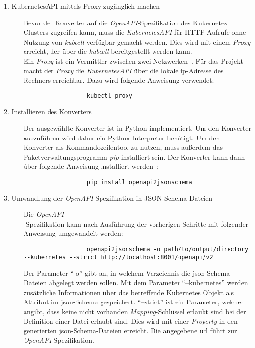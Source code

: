 \begin{description}
  \item[1. KubernetesAPI mittels Proxy zugänglich machen]
        Bevor der Konverter auf die \textit{OpenAPI}-Spezifikation des Kubernetes Clusters zugreifen kann, muss die \textit{KubernetesAPI}
        für HTTP-Aufrufe ohne Nutzung von \textit{kubectl} verfügbar gemacht werden. Dies wird mit einem \textit{Proxy} erreicht, der über die \textit{kubectl}
        bereitgestellt werden kann. \\
        Ein \textit{Proxy} ist ein Vermittler zwischen zwei Netzwerken~\cite{proxy-ryte-wiki,proxy-it-service-network}.
        Für das Projekt macht der \textit{Proxy} die \textit{KubernetesAPI} über die lokale \acs{ip}-Adresse des Rechners erreichbar.
        Dazu wird folgende Anweisung verwendet:
        \begin{verbatim}
                  kubectl proxy
            \end{verbatim}
  \item[2. Installieren des Konverters]
        Der ausgewählte Konverter ist in Python implementiert. Um den Konverter auszuführen wird daher ein Python-Interpreter benötigt.
        Um den Konverter als Kommandozeilentool zu nutzen, muss außerdem das Paketverwaltungsprogramm \textit{pip} installiert sein.
        Der Konverter kann dann über folgende Anweisung installiert werden~\cite{openapi-to-json-schema}:
        \begin{verbatim}
                  pip install openapi2jsonschema
            \end{verbatim}
  \item[3. Umwandlung der \textit{OpenAPI}-Spezifikation in JSON-Schema Dateien]
        Die \textit{OpenAPI}\\-Spezifikation kann nach Ausführung der vorherigen Schritte mit folgender Anweisung umgewandelt werden:
        \begin{verbatim}
                  openapi2jsonschema -o path/to/output/directory --kubernetes --strict http://localhost:8001/openapi/v2
            \end{verbatim}
        Der Parameter ``-o'' gibt an, in welchem Verzeichnis die \ac{json}-Schema-Dateien abgelegt werden sollen.
        Mit dem Parameter ``--kubernetes'' werden zusätzliche Informationen über das betreffende Kubernetes Objekt als Attribut im \ac{json}-Schema gespeichert.
        ``--strict'' ist ein Parameter, welcher angibt, dass keine nicht vorhanden \textit{Mapping}-Schlüssel erlaubt sind bei der Definition einer Datei erlaubt sind.
        Dies wird mit einer \textit{Property} in den generierten \ac{json}-Schema-Dateien erreicht.
        Die angegebene \ac{url} führt zur \textit{OpenAPI}-Spezifikation.
\end{description}

